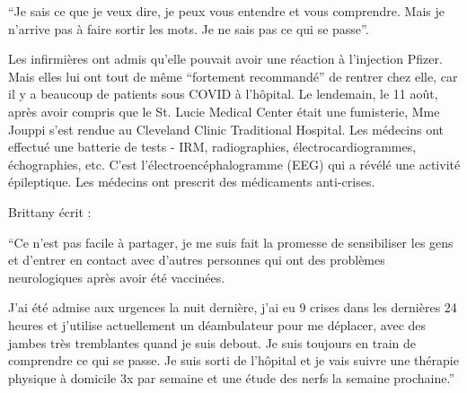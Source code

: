 {“Je sais ce que je veux dire, je peux vous entendre et vous comprendre. Mais je
n'arrive pas à faire sortir les mots. Je ne sais pas ce qui se passe”.

Les infirmières ont admis qu'elle pouvait avoir une réaction à l'injection
Pfizer. Mais elles lui ont tout de même “fortement recommandé” de rentrer chez
elle, car il y a beaucoup de patients sous COVID à l'hôpital. Le lendemain, le
11 août, après avoir compris que le St. Lucie Medical Center était une
fumisterie, Mme Jouppi s'est rendue au Cleveland Clinic Traditional
Hospital. Les médecins ont effectué une batterie de tests - IRM, radiographies,
électrocardiogrammes, échographies, etc. C'est l'électroencéphalogramme (EEG)
qui a révélé une activité épileptique. Les médecins ont prescrit des médicaments
anti-crises.

Brittany écrit :

“Ce n'est pas facile à partager, je me suis fait la promesse de sensibiliser les
gens et d'entrer en contact avec d'autres personnes qui ont des problèmes
neurologiques après avoir été vaccinées.

J'ai été admise aux urgences la nuit dernière, j'ai eu 9 crises dans les
dernières 24 heures et j'utilise actuellement un déambulateur pour me déplacer,
avec des jambes très tremblantes quand je suis debout. Je suis toujours en train
de comprendre ce qui se passe. Je suis sorti de l'hôpital et je vais suivre une
thérapie physique à domicile 3x par semaine et une étude des nerfs la semaine
prochaine.”

}
